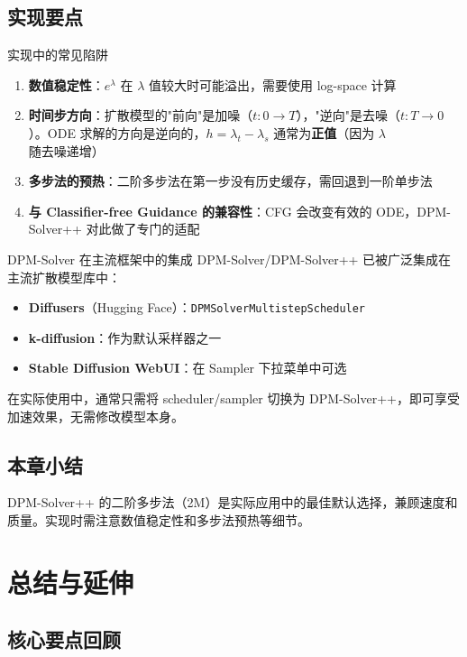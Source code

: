 \documentclass[a4paper]{article}
\begin{document}
\subsection{实现要点}

\begin{warningbox}{实现中的常见陷阱}
\begin{enumerate}
    \item \textbf{数值稳定性}：$e^{\lambda}$ 在 $\lambda$ 值较大时可能溢出，需要使用 log-space 计算
    \item \textbf{时间步方向}：扩散模型的"前向"是加噪（$t: 0 \to T$），"逆向"是去噪（$t: T \to 0$）。ODE 求解的方向是逆向的，$h = \lambda_t - \lambda_s$ 通常为\textbf{正值}（因为 $\lambda$ 随去噪递增）
    \item \textbf{多步法的预热}：二阶多步法在第一步没有历史缓存，需回退到一阶单步法
    \item \textbf{与 Classifier-free Guidance 的兼容性}：CFG 会改变有效的 ODE，DPM-Solver++ 对此做了专门的适配
\end{enumerate}
\end{warningbox}

\begin{knowledgebox}{DPM-Solver 在主流框架中的集成}
DPM-Solver/DPM-Solver++ 已被广泛集成在主流扩散模型库中：
\begin{itemize}
    \item \textbf{Diffusers}（Hugging Face）：\texttt{DPMSolverMultistepScheduler}
    \item \textbf{k-diffusion}：作为默认采样器之一
    \item \textbf{Stable Diffusion WebUI}：在 Sampler 下拉菜单中可选
\end{itemize}
在实际使用中，通常只需将 scheduler/sampler 切换为 DPM-Solver++，即可享受加速效果，无需修改模型本身。
\end{knowledgebox}

\subsection{本章小结}

DPM-Solver++ 的二阶多步法（2M）是实际应用中的最佳默认选择，兼顾速度和质量。实现时需注意数值稳定性和多步法预热等细节。

\section{总结与延伸}

\subsection{核心要点回顾}
\end{document}
